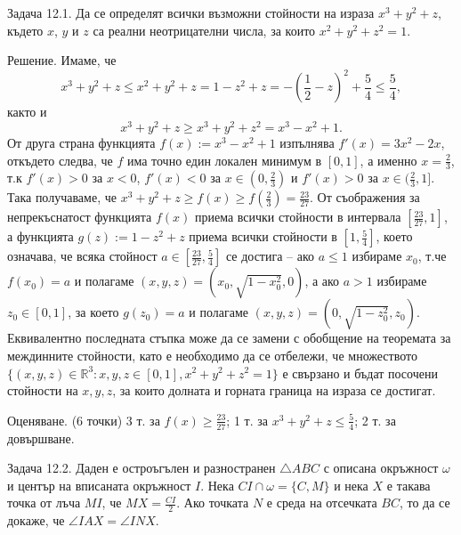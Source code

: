 
Задача 12.1. Да се определят всички възможни стойности на израза $x^3+y^2+z$, където $x$, $y$ и $z$ са реални неотрицателни числа, за които $x^2+y^2+z^2=1$.

Решение. Имаме, че
$$x^3+y^2+z\le x^2+y^2+z=1-z^2+z=-\left(\frac12-z\right)^2+\frac54\le\frac54,$$
както и
$$x^3+y^2+z\ge x^3+y^2+z^2=x^3-x^2+1.$$
От друга страна функцията $f(x):=x^3-x^2+1$ изпълнява $f'(x)=3x^2-2x$, откъдето следва, че $f$ има точно един локален минимум в $[0,1]$, а именно $x=\frac23$, т.к $f'(x)>0$ за $x<0$, $f'(x)<0$ за $x\in(0,\frac23)$ и $f'(x)>0$ за $x\in(\frac23,1]$. Така получаваме, че $x^3+y^2+z\ge f(x)\ge f(\frac23)=\frac{23}{27}$. От съображения за непрекъснатост функцията $f(x)$ приема всички стойности в интервала $[\frac{23}{27},1]$, а функцията $g(z):=1-z^2+z$ приема всички стойности в $[1,\frac54]$, което означава, че всяка стойност $a\in[\frac{23}{27},\frac54]$ се достига – ако $a\le1$ избираме $x_0$, т.че $f(x_0)=a$ и полагаме $(x,y,z)=(x_0,\sqrt{1-x_0^2},0)$, а ако $a>1$ избираме $z_0\in[0,1]$, за което $g(z_0)=a$ и полагаме $(x,y,z)=(0,\sqrt{1-z_0^2},z_0)$. Еквивалентно последната стъпка може да се замени с обобщение на теоремата за междинните стойности, като е необходимо да се отбележи, че множеството $\{(x,y,z)\in\mathbb R^3:x,y,z\in[0,1],x^2+y^2+z^2=1\}$ е свързано и бъдат посочени стойности на $x,y,z$, за които долната и горната граница на израза се достигат.

Оценяване. (6 точки) 3 т. за $f(x)\ge\frac{23}{27}$; 1 т. за $x^3+y^2+z\le\frac54$; 2 т. за довършване.

Задача 12.2. Даден е остроъгълен и разностранен $\triangle ABC$ с описана окръжност $\omega$ и център на вписаната окръжност $I$. Нека $CI\cap\omega=\{C,M\}$ и нека $X$ е такава точка от лъча $MI$, че $MX=\frac{CI}{2}$. Ако точката $N$ е среда на отсечката $BC$, то да се докаже, че $\angle IAX=\angle INX$.

